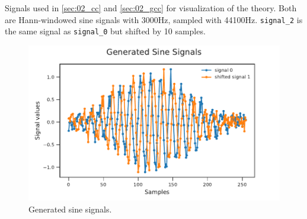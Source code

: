 Signals used in \cref{sec:02_cc} and \cref{sec:02_gcc} for visualization of the theory.
Both are Hann-windowed sine signals with 3000\si{Hz}, sampled with 44100\si{Hz}.
\lstinline!signal_2! is the same signal as \lstinline!signal_0! but shifted by
10 samples.
\begin{figure}[ht]
	\centering
		\includegraphics[width=1\columnwidth]{figures/signals_theory}
	\caption{Generated sine signals.}
	\label{fig:ap1_signals}
\end{figure}


